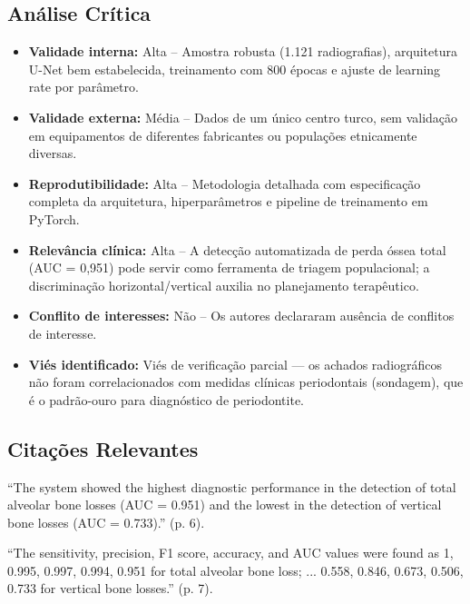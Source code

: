 \subsection{Análise Crítica}
\begin{itemize}
  \item \textbf{Validade interna:} Alta -- Amostra robusta (1.121
        radiografias), arquitetura U-Net bem estabelecida, treinamento
        com 800 épocas e ajuste de learning rate por parâmetro.
  \item \textbf{Validade externa:} Média -- Dados de um único centro
        turco, sem validação em equipamentos de diferentes fabricantes
        ou populações etnicamente diversas.
  \item \textbf{Reprodutibilidade:} Alta -- Metodologia detalhada com
        especificação completa da arquitetura, hiperparâmetros e pipeline
        de treinamento em PyTorch.
  \item \textbf{Relevância clínica:} Alta -- A detecção automatizada de
        perda óssea total (AUC = 0,951) pode servir como ferramenta de
        triagem populacional; a discriminação horizontal/vertical auxilia
        no planejamento terapêutico.
  \item \textbf{Conflito de interesses:} Não -- Os autores declararam
        ausência de conflitos de interesse.
  \item \textbf{Viés identificado:} Viés de verificação parcial — os
        achados radiográficos não foram correlacionados com medidas
        clínicas periodontais (sondagem), que é o padrão-ouro para
        diagnóstico de periodontite.
\end{itemize}

\subsection{Citações Relevantes}
\begin{citacao}
``The system showed the highest diagnostic performance in the detection of
total alveolar bone losses (AUC = 0.951) and the lowest in the detection
of vertical bone losses (AUC = 0.733).'' (p. 6).
\end{citacao}

\begin{citacao}
``The sensitivity, precision, F1 score, accuracy, and AUC values were found
as 1, 0.995, 0.997, 0.994, 0.951 for total alveolar bone loss; ... 0.558,
0.846, 0.673, 0.506, 0.733 for vertical bone losses.'' (p. 7).
\end{citacao}

